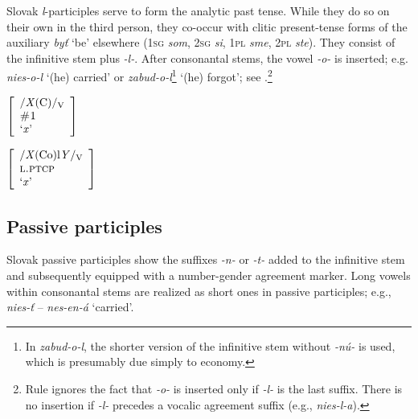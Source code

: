 \documentclass[output=paper,colorlinks,citecolor=brown,
]{langscibook}
\begin{document}
Slovak \textit{l}-participles serve to form the analytic past tense. While they do so on their own in the third person, they co-occur with clitic present-tense forms of the auxiliary \textit{byť} `be' elsewhere (\textsc{1sg} \textit{som}, \textsc{2sg} \textit{si}, \textsc{1pl} \textit{sme}, \textsc{2pl} \textit{ste}). They consist of the infinitive stem plus \textit{-l-}. After consonantal stems, the vowel \textit{-o-} is inserted; e.g. \textit{nies-o-l} `(he) carried' or \textit{zabud-o-l}\footnote{In \textit{zabud-o-l}, the shorter version of the infinitive stem without \textit{-nú-} is used, which is presumably due simply to economy.} `(he) forgot'; see .\footnote{Rule  ignores the fact that \textit{-o-} is inserted only if \textit{-l-} is the last suffix. There is no insertion if \textit{-l-} precedes a vocalic agreement suffix (e.g., \textit{nies-l-a}).}

\begin{minipage}[t]{0.28\textwidth}
\ea\label{ex:ruleLPT}
$\left[
\begin{array}{l}
    \text{/\textit{X}(C)/\textsubscript{V}} \\
    \textsc{\#1} \\
    \text{`\textit{x}'}
\end{array}
\right] $ 
\z
\end{minipage}%
\begin{minipage}[t]{0.45\textwidth}
\begin{exe}
\exi{$\longleftrightarrow$}
$\left[
\begin{array}{l}
    \text{/\textit{X}(Co)l\textit{Y}/\textsubscript{V}} \\
    \textsc{l.ptcp} \\
    \text{`\textit{x}'}
\end{array}
\right] $
\end{exe}
\end{minipage}


\subsection{Passive participles}\label{sec:PPP}

Slovak passive participles show the suffixes \textit{-n-} or \textit{-t-} added to the infinitive stem and subsequently equipped with a number-gender agreement marker. Long vowels within consonantal stems are realized as short ones in passive participles; e.g., \textit{nies-ť} -- \textit{nes-en-á} `carried'.
\end{document}
